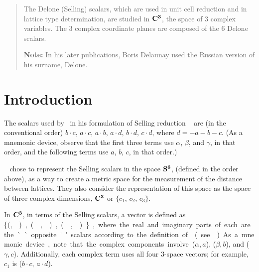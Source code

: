\documentclass[preprint]{iucr}              %
\numberwithin{equation}{section}
\newcommand{\SVI}[0]{$\bf{S^{6}}$}
\newcommand{\CIII}[0]{$\bf{C^{3}}$}
\begin{document}
	\newcommand{\OPES}[0]{$E^3toS^6$}
	\newcommand{\OPESS}[0]{$$E^3toS^6$$}
	\newcommand{\MSVI}[0]{$M_{S^{6}}$}
	\newcommand{\MEIII}[0]{$M_{E^{3}}$}
	\newcommand{\Plus}[0]{$\textfrak{P}$}	
	\newcommand{\Minus}[0]{$\textfrak{M}$}
	
	\newcommand{\ci}[0]{$c_1$}
	\newcommand{\cii}[0]{$c_2$}
	\newcommand{\ciii}[0]{$c_3$}
	
	
	\begin{abstract}
		
		The Delone (Selling) scalars, which are used in 
		unit cell reduction and in lattice type determination,
		are studied in \CIII, the space of 3 complex variables.
		The 3 complex coordinate planes are composed of the 6
		Delone scalars.
		
		{\bf Note:}  In his later publications, Boris Delaunay used the Russian version of his surname, Delone.\\
		
		
	\end{abstract}
	
	
	\section{Introduction}
	
	The scalars used by~ in his formulation of Selling reduction ~\cite{Selling1874}
	are (in the conventional order) $b \cdot c$, $a \cdot c$, $a \cdot b$, $a \cdot d$, 
	$b \cdot d$, $c \cdot d$, where $d = -a-b-c$. 
	(As a mnemonic device, 
	observe that the first three terms use
	$\alpha$, $\beta$, and $\gamma$, 
	in that order, 
	and the following terms use $a$, $b$, $c$, in that order.)
	
	~ chose to 
	represent the Selling scalars in the space \SVI{},
	\Svec{} (defined in the order above), 
	as a way to create a metric space
	for the measurement of the distance between lattices. 
	They also consider the representation of this space as the
	space of three complex dimensions, \CIII{} or 
	{$\{c_1$}, {$c_2$}, {$c_3\}$}. 	
	
	In \CIII{}, in terms of the Selling scalars, 
	a vector is defined as \{(\si,\siv ), (\sii,\sv),(\siii,\svi)\}, 
	where the real and imaginary parts
	of each are the ``opposite'' scalars 
	according to the definition of~ (see~).
	As a mnemonic device, 
	note that the complex components involve ($\alpha,a$), ($\beta, b$), and ($\gamma,c$).
	Additionally, each complex term uses all 
	four 3-space vectors; for example, $c_1$ is ($b \cdot c$, $a \cdot d$).
	
\end{document}
